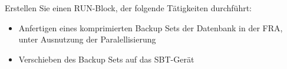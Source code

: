     \item Erstellen Sie einen RUN-Block, der folgende Tätigkeiten durchführt:
      \begin{itemize}
        \item Anfertigen eines komprimierten Backup Sets der Datenbank in der FRA, unter Ausnutzung der Paralellisierung
        \item Verschieben des Backup Sets auf das SBT-Gerät
      \end{itemize}
